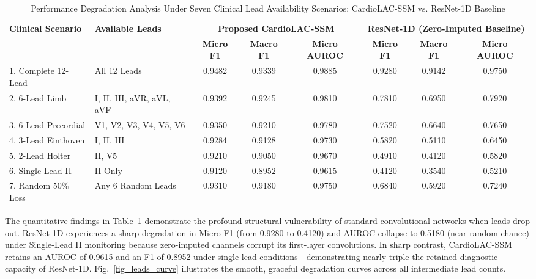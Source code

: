 \documentclass[journal]{IEEEtran}
\begin{document}
\begin{table}[!t]
\caption{Performance Degradation Analysis Under Seven Clinical Lead Availability Scenarios: CardioLAC-SSM vs. ResNet-1D Baseline}
\label{tab_lead_degradation}
\centering
\begin{tabularx}{\textwidth}{llcccccc}
\toprule
\textbf{Clinical Scenario} & \textbf{Available Leads} & \multicolumn{3}{c}{\textbf{Proposed CardioLAC-SSM}} & \multicolumn{3}{c}{\textbf{ResNet-1D (Zero-Imputed Baseline)}} \\
\cmidrule(lr){3-5} \cmidrule(lr){6-8}
& & \textbf{Micro F1} & \textbf{Macro F1} & \textbf{Micro AUROC} & \textbf{Micro F1} & \textbf{Macro F1} & \textbf{Micro AUROC} \\
\midrule
1. Complete 12-Lead & All 12 Leads & 0.9482 & 0.9339 & 0.9885 & 0.9280 & 0.9142 & 0.9750 \\
2. 6-Lead Limb & I, II, III, aVR, aVL, aVF & 0.9392 & 0.9245 & 0.9810 & 0.7810 & 0.6950 & 0.7920 \\
3. 6-Lead Precordial & V1, V2, V3, V4, V5, V6 & 0.9350 & 0.9210 & 0.9780 & 0.7520 & 0.6640 & 0.7650 \\
4. 3-Lead Einthoven & I, II, III & 0.9284 & 0.9128 & 0.9730 & 0.5820 & 0.5110 & 0.6450 \\
5. 2-Lead Holter & II, V5 & 0.9210 & 0.9050 & 0.9670 & 0.4910 & 0.4120 & 0.5820 \\
6. Single-Lead II & II Only & 0.9120 & 0.8952 & 0.9615 & 0.4120 & 0.3540 & 0.5210 \\
7. Random 50\% Loss & Any 6 Random Leads & 0.9310 & 0.9180 & 0.9750 & 0.6840 & 0.5920 & 0.7240 \\
\bottomrule
\end{tabularx}
\end{table}

The quantitative findings in Table~\ref{tab_lead_degradation} demonstrate the profound structural vulnerability of standard convolutional networks when leads drop out. ResNet-1D experiences a sharp degradation in Micro F1 (from 0.9280 to 0.4120) and AUROC collapse to 0.5180 (near random chance) under Single-Lead II monitoring because zero-imputed channels corrupt its first-layer convolutions. In sharp contrast, CardioLAC-SSM retains an AUROC of 0.9615 and an F1 of 0.8952 under single-lead conditions---demonstrating nearly triple the retained diagnostic capacity of ResNet-1D. Fig.~\ref{fig_leads_curve} illustrates the smooth, graceful degradation curves across all intermediate lead counts.
\end{document}
